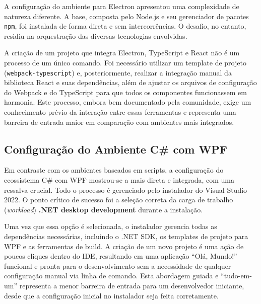 A configuração do ambiente para Electron apresentou uma complexidade de natureza diferente. A base, composta pelo Node.js e seu gerenciador de pacotes \texttt{npm}, foi instalada de forma direta e sem intercorrências. O desafio, no entanto, residiu na orquestração das diversas tecnologias envolvidas.

A criação de um projeto que integra Electron, TypeScript e React não é um processo de um único comando. Foi necessário utilizar um template de projeto (\texttt{webpack-typescript}) e, posteriormente, realizar a integração manual da biblioteca React e suas dependências, além de ajustar os arquivos de configuração do Webpack e do TypeScript para que todos os componentes funcionassem em harmonia. Este processo, embora bem documentado pela comunidade, exige um conhecimento prévio da interação entre essas ferramentas e representa uma barreira de entrada maior em comparação com ambientes mais integrados.

\subsection{Configuração do Ambiente C\# com WPF}

Em contraste com os ambientes baseados em scripts, a configuração do ecossistema C\# com WPF mostrou-se a mais direta e integrada, com uma ressalva crucial. Todo o processo é gerenciado pelo instalador do Visual Studio 2022. O ponto crítico de sucesso foi a seleção correta da carga de trabalho (\textit{workload}) \textbf{.NET desktop development} durante a instalação.

Uma vez que essa opção é selecionada, o instalador gerencia todas as dependências necessárias, incluindo o .NET SDK, os templates de projeto para WPF e as ferramentas de build. A criação de um novo projeto é uma ação de poucos cliques dentro do IDE, resultando em uma aplicação ``Olá, Mundo!''  funcional e pronta para o desenvolvimento sem a necessidade de qualquer configuração manual via linha de comando. Esta abordagem guiada e ``tudo-em-um'' representa a menor barreira de entrada para um desenvolvedor iniciante, desde que a configuração inicial no instalador seja feita corretamente. 
